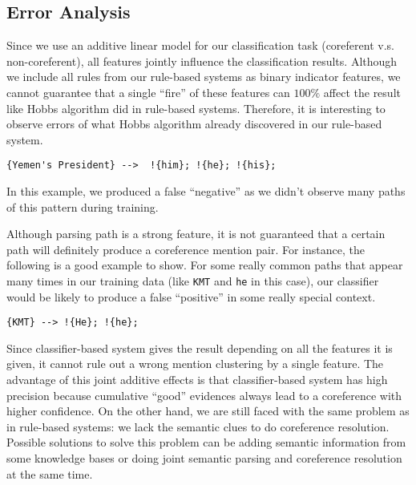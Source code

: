 \documentclass[letterpaper]{article}
\begin{document}
\subsection{Error Analysis}
Since we use an additive linear model for our classification task (coreferent v.s. non-coreferent), all features jointly influence the classification results.
Although we include all rules from our rule-based systems as binary indicator features, we cannot guarantee that a single ``fire'' of these features can $100\%$ affect the result like Hobbs algorithm did in rule-based systems.
Therefore, it is interesting to observe errors of what Hobbs algorithm already discovered in our rule-based system.
\begin{verbatim}
{Yemen's President} -->  !{him}; !{he}; !{his}; 
\end{verbatim}
In this example, we produced a false ``negative'' as we didn't observe many paths of this pattern during training.

\vspace{0.1cm}

Although parsing path is a strong feature, it is not guaranteed that a certain path will definitely produce a coreference mention pair. For instance, the following is a good example to show. For some really common paths that appear many times in our training data (like \texttt{KMT} and \texttt{he} in this case), our classifier would be likely to produce a false ``positive'' in some really special context.
\begin{verbatim}
{KMT} --> !{He}; !{he};
\end{verbatim}
Since classifier-based system gives the result depending on all the features it is given, it cannot rule out a wrong mention clustering by a single feature.
The advantage of this joint additive effects is that classifier-based system has high precision because cumulative ``good'' evidences always lead to a coreference with higher confidence. On the other hand, we are still faced with the same problem as in rule-based systems: we lack the semantic clues to do coreference resolution. Possible solutions to solve this problem can be adding semantic information from some knowledge bases or doing joint semantic parsing and coreference resolution at the same time.
\end{document}
